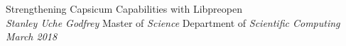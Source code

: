 \documentclass[dvips,letterpaper,12pt]{report}
\begin{document}

\thesistitle
	{
	  Strengthening Capsicum Capabilities with Libpreopen \\
	 \footnotesize{\sl}}
	{\emph{Stanley Uche Godfrey} }
	{Master of \emph{Science} }
	{Department of \emph{Scientific Computing}}
	{\emph{March 2018} }
















\appendix

\end{document}
